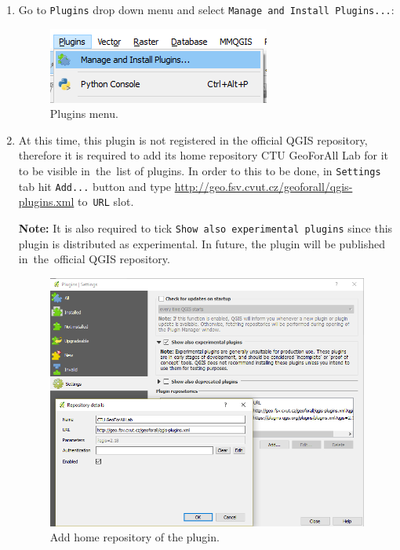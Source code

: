 \begin{enumerate}
\item
  Go to \texttt{Plugins} drop down menu and select
  \texttt{Manage and Install Plugins...}:


\begin{figure}[H]
\centering
\includegraphics{pictures/user_guide/install_plugin_dropdown.png}
\caption{Plugins menu.}
\end{figure}

\item At this time, this plugin is not registered in the official QGIS
repository, therefore it is required to add its home repository CTU
GeoForAll Lab for it to be visible in~the~list of plugins. In order to
this to be done, in \texttt{Settings} tab hit \texttt{Add...} button and
type \url{http://geo.fsv.cvut.cz/geoforall/qgis-plugins.xml} to~\texttt{URL} 
slot.

\textbf{Note: }It is also required to tick \texttt{Show also experimental plugins} 
since this plugin is distributed as experimental. In future, the plugin 
will be published in~the~official QGIS repository.


\begin{figure}[H]
\centering
\includegraphics[scale = 0.7]{pictures/user_guide/settings.png}
\caption{Add home repository of the plugin.}
\end{figure}




\end{enumerate}
